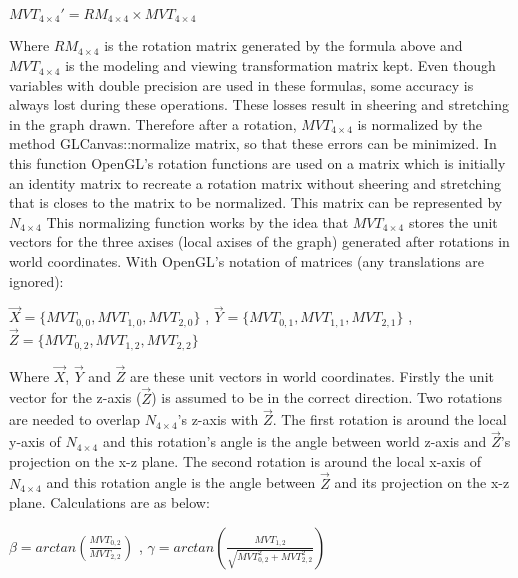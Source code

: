 \documentclass[a4paper]{article}
\begin{document}
\begin{center}
\begin{math}
MVT_{4 \times 4}' = RM_{4 \times 4} \times MVT_{4 \times 4}
\end{math}
\end{center}
Where $RM_{4 \times 4}$ is the rotation matrix generated by the formula above and $MVT_{4 \times 4}$ is the modeling and viewing transformation matrix kept. Even though variables with double precision are used in these formulas, some accuracy is always lost during these operations. These losses result in sheering and stretching in the graph drawn. Therefore after a rotation, $MVT_{4 \times 4}$ is normalized by the method GLCanvas::normalize matrix, so that these errors can be minimized. In this function OpenGL's rotation functions are used on a matrix which is initially an identity matrix to recreate a rotation matrix without sheering and stretching that is closes to the matrix to be normalized. This matrix can be represented by $N_{4 \times 4}$ This normalizing function works by the idea that $MVT_{4 \times 4}$ stores the unit vectors for the three axises (local axises of the graph) generated after rotations in world coordinates. With OpenGL's notation of matrices (any translations are ignored):
\begin{center}
\begin{math}
\vec{X} = \{MVT_{0,0}, MVT_{1,0}, MVT_{2,0}\}
\end{math}
,
\begin{math}
\vec{Y} = \{MVT_{0,1}, MVT_{1,1}, MVT_{2,1}\}
\end{math}
,
\begin{math}
\vec{Z} = \{MVT_{0,2}, MVT_{1,2}, MVT_{2,2}\}
\end{math}
\end{center}
Where $\vec{X}$, $\vec{Y}$ and $\vec{Z}$ are these unit vectors in world coordinates. Firstly the unit vector for the z-axis ($\vec{Z}$) is assumed to be in the correct direction. Two rotations are needed to overlap $N_{4 \times 4}$'s z-axis with $\vec{Z}$. The first rotation is around the local y-axis of $N_{4 \times 4}$ and this rotation's angle is the angle between world z-axis and $\vec{Z}$'s projection on the x-z plane. The second rotation is around the local x-axis of $N_{4 \times 4}$ and this rotation angle is the angle between $\vec{Z}$ and its projection on the x-z plane. Calculations are as below:
\begin{center}
\begin{math}
\beta = arctan\left(\frac{MVT_{0,2}}{MVT_{2,2}}\right)
\end{math}
,
\begin{math}
\gamma = arctan\left(\frac{MVT_{1,2}}{\sqrt{MVT_{0,2}^2 + MVT_{2,2}^2}}\right)
\end{math}
\end{center}
\end{document}
